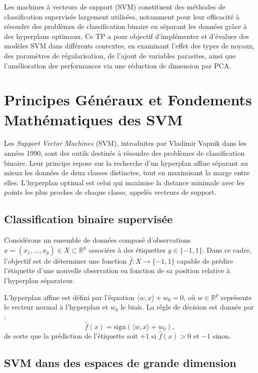 \documentclass[12pt,a4paper]{report}
\begin{document}
Les machines à vecteurs de support (SVM) constituent des méthodes de classification supervisée largement utilisées, notamment pour leur efficacité à résoudre des problèmes de classification binaire en séparant les données grâce à des hyperplans optimaux. Ce TP a pour objectif d’implémenter et d’évaluer des modèles SVM dans différents contextes, en examinant l’effet des types de noyaux, des paramètres de régularisation, de l’ajout de variables parasites, ainsi que l’amélioration des performances via une réduction de dimension par PCA.

\section{Principes Généraux et Fondements Mathématiques des SVM}


Les \textit{Support Vector Machines} (SVM), introduites par Vladimir Vapnik dans les années 1990, sont des outils destinés à résoudre des problèmes de classification binaire. Leur principe repose sur la recherche d’un hyperplan affine séparant au mieux les données de deux classes distinctes, tout en maximisant la marge entre elles. L’hyperplan optimal est celui qui maximise la distance minimale avec les points les plus proches de chaque classe, appelés vecteurs de support.

\subsection{Classification binaire supervisée}

Considérons un ensemble de données composé d’observations \( x = (x_1, ..., x_p) \in X \subset \mathbb{R}^p \) associées à des étiquettes \( y \in \{-1, 1\} \). Dans ce cadre, l’objectif est de déterminer une fonction \( \hat{f} : X \to \{-1, 1\} \) capable de prédire l’étiquette d’une nouvelle observation en fonction de sa position relative à l’hyperplan séparateur.

L’hyperplan affine est défini par l’équation \( \langle w, x \rangle + w_0 = 0 \), où \( w \in \mathbb{R}^p \) représente le vecteur normal à l’hyperplan et \( w_0 \) le biais. La règle de décision est donnée par :
\[
\hat{f}(x) = \text{sign}\left(\langle w, x \rangle + w_0\right),
\]
de sorte que la prédiction de l’étiquette soit \( +1 \) si \( \hat{f}(x) > 0 \) et \( -1 \) sinon.

\subsection{SVM dans des espaces de grande dimension}
\end{document}
